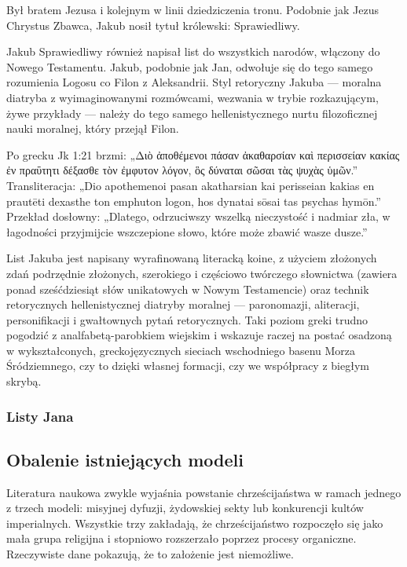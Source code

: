 Był bratem Jezusa i kolejnym w linii dziedziczenia tronu.
Podobnie jak Jezus Chrystus Zbawca, Jakub nosił tytuł królewski: Sprawiedliwy.

Jakub Sprawiedliwy również napisał list do wszystkich narodów, włączony do Nowego Testamentu.
Jakub, podobnie jak Jan, odwołuje się do tego samego rozumienia Logosu co Filon z Aleksandrii.
Styl retoryczny Jakuba — moralna diatryba z wyimaginowanymi rozmówcami, wezwania w trybie rozkazującym, żywe przykłady — należy do tego samego hellenistycznego nurtu filozoficznej nauki moralnej, który przejął Filon.

Po grecku Jk 1:21 brzmi:
„Διὸ ἀποθέμενοι πάσαν ἀκαθαρσίαν καὶ περισσείαν κακίας ἐν πραΰτητι δέξασθε τὸν ἐμφυτον λόγον, ὃς δύναται σῶσαι τὰς ψυχὰς ὑμῶν.”
Transliteracja: „Dio apothemenoi pasan akatharsian kai perisseian kakias en prautēti dexasthe ton emphuton logon, hos dynatai sōsai tas psychas hymōn.”
Przekład dosłowny: „Dlatego, odrzuciwszy wszelką nieczystość i nadmiar zła, w łagodności przyjmijcie wszczepione słowo, które może zbawić wasze dusze.”

List Jakuba jest napisany wyrafinowaną literacką koine, z użyciem złożonych zdań podrzędnie złożonych, szerokiego i częściowo twórczego słownictwa (zawiera ponad sześćdziesiąt słów unikatowych w Nowym Testamencie) oraz technik retorycznych hellenistycznej diatryby moralnej — paronomazji, aliteracji, personifikacji i gwałtownych pytań retorycznych.
Taki poziom greki trudno pogodzić z analfabetą-parobkiem wiejskim i wskazuje raczej na postać osadzoną w wykształconych, greckojęzycznych sieciach wschodniego basenu Morza Śródziemnego, czy to dzięki własnej formacji, czy we współpracy z biegłym skrybą.

\subsubsection{Listy Jana}\label{subsec:the-epistles-of-john}

\subsection{Obalenie istniejących modeli}\label{subsec:a-disproof-of-existing-models}

Literatura naukowa zwykle wyjaśnia powstanie chrześcijaństwa w ramach jednego z trzech modeli: misyjnej dyfuzji, żydowskiej sekty lub konkurencji kultów imperialnych.
Wszystkie trzy zakładają, że chrześcijaństwo rozpoczęło się jako mała grupa religijna i stopniowo rozszerzało poprzez procesy organiczne.
Rzeczywiste dane pokazują, że to założenie jest niemożliwe.

